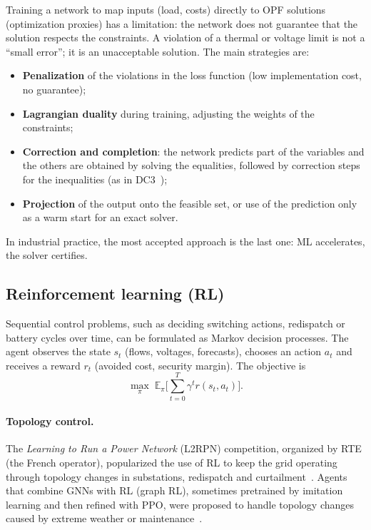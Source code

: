 \documentclass[10pt,a4paper,oneside]{article}
\begin{document}
Training a network to map inputs (load, costs) directly to OPF solutions
(optimization proxies) has a limitation: the network does not guarantee that
the solution respects the constraints. A violation of a thermal or voltage
limit is not a ``small error''; it is an unacceptable solution. The main
strategies are:
\begin{itemize}
  \item \textbf{Penalization} of the violations in the loss function (low
    implementation cost, no guarantee);
  \item \textbf{Lagrangian duality} during training, adjusting the weights of
    the constraints;
  \item \textbf{Correction and completion}: the network predicts part of the
    variables and the others are obtained by solving the equalities,
    followed by correction steps for the inequalities (as in
    DC3~\cite{dc3});
  \item \textbf{Projection} of the output onto the feasible set, or use of
    the prediction only as a warm start for an exact solver.
\end{itemize}
In industrial practice, the most accepted approach is the last one: ML
accelerates, the solver certifies.

\subsection{Reinforcement learning (RL)}

Sequential control problems, such as deciding switching actions, redispatch
or battery cycles over time, can be formulated as Markov decision processes.
The agent observes the state $s_t$ (flows, voltages, forecasts), chooses an
action $a_t$ and receives a reward $r_t$ (avoided cost, security margin). The
objective is
\begin{equation}
  \max_\pi \; \mathbb{E}_\pi\Big[\sum_{t=0}^{T} \gamma^t r(s_t, a_t)\Big].
\end{equation}

\paragraph{Topology control.} The \textit{Learning to Run a Power Network}
(L2RPN) competition, organized by RTE (the French operator), popularized the
use of RL to keep the grid operating through topology changes in
substations, redispatch and curtailment~\cite{l2rpn}. Agents that combine
GNNs with RL (graph RL), sometimes pretrained by imitation learning and then
refined with PPO, were proposed to handle topology changes caused by extreme
weather or maintenance~\cite{graphrlsurvey,ppognn}.
\end{document}
